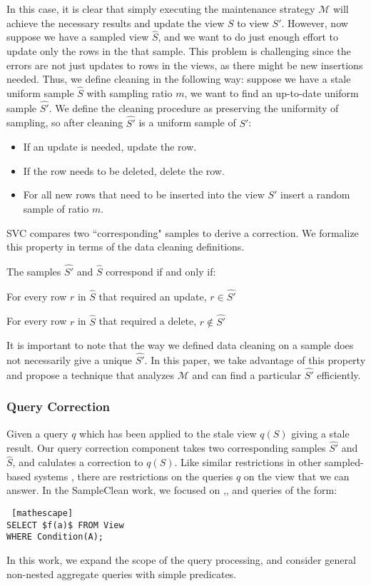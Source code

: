 In this case, it is clear that simply executing the maintenance strategy $\mathcal{M}$ will achieve the necessary results and update the view $S$ to view $S'$.
However, now suppose we have a sampled view $\hat{S}$, and we want to do just enough effort to update only the rows in the that sample.
This problem is challenging since the errors are not just updates to rows in the views, as there might be new insertions needed.
Thus, we define cleaning in the following way: suppose we have a stale uniform sample $\hat{S}$ with sampling ratio $m$, we want to find an up-to-date uniform sample $\hat{S'}$.
We define the cleaning procedure as preserving the uniformity of sampling, so after cleaning $\hat{S'}$ is a uniform sample of $S'$:
\begin{itemize}
\item If an update is needed, update the row.
\item If the row needs to be deleted, delete the row.
\item For all new rows that need to be inserted into the view $S'$ insert a random sample of ratio $m$.
\end{itemize}
SVC compares two ``corresponding" samples to derive a correction.
We formalize this property in terms of the data cleaning definitions.
\begin{definition}[Correspondence]
The samples $\hat{S'}$ and $\hat{S}$ correspond if and only if:
\item For every row $r$ in $\hat{S}$ that required an update, $r\in \hat{S'}$
\item For every row $r$ in $\hat{S}$ that required a delete, $r \not\in \hat{S'}$
\end{definition}

It is important to note that the way we defined data cleaning on a sample does not necessarily give a unique $\hat{S'}$. 
In this paper, we take advantage of this property and propose a technique that analyzes $\mathcal{M}$ and can find a particular $\hat{S'}$
efficiently.

\subsubsection{Query Correction}
Given a query $q$ which has been applied to the stale view $q(S)$ giving a stale result.
Our query correction component takes two corresponding samples $\hat{S'}$ and $\hat{S}$, and calulates a correction to $q(S)$.
Like similar restrictions in other sampled-based systems \cite{agarwalknowing}, there are restrictions on the queries $q$ on the view that we can answer. 
In the SampleClean work, we focused on \sumfunc,\countfunc, and \avgfunc queries of the form: 
\begin{lstlisting} [mathescape]
SELECT $f(a)$ FROM View 
WHERE Condition(A);
\end{lstlisting}
In this work, we expand the scope of the query processing, and consider general non-nested aggregate queries with simple predicates.


